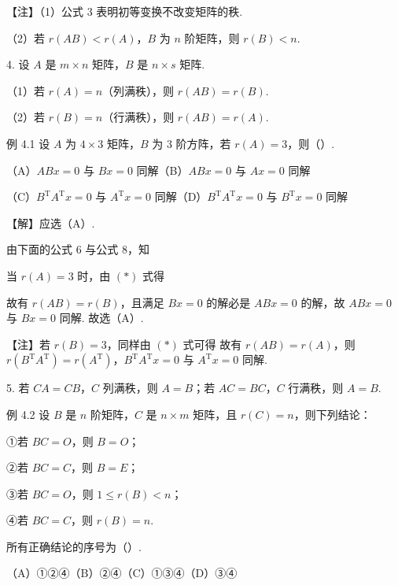 \begin{fnote}
【注】（1）公式 3 表明初等变换不改变矩阵的秩.

（2）若 $r(AB)<r(A)$，$B$ 为 $n$ 阶矩阵，则 $r(B)<n$.
\end{fnote}

4. 设 $A$ 是 $m\times n$ 矩阵，$B$ 是 $n\times s$ 矩阵.

（1）若 $r(A)=n$（列满秩），则 $r(AB)=r(B)$.

（2）若 $r(B)=n$（行满秩），则 $r(AB)=r(A)$.

\begin{fcard}{例 4.1}
设 $A$ 为 $4\times 3$ 矩阵，$B$ 为 3 阶方阵，若 $r(A)=3$，则（\quad）.

（A）$ABx=0$ 与 $Bx=0$ 同解\qquad\qquad（B）$ABx=0$ 与 $Ax=0$ 同解

（C）$B^{\mathrm T}A^{\mathrm T}x=0$ 与 $A^{\mathrm T}x=0$ 同解\qquad（D）$B^{\mathrm T}A^{\mathrm T}x=0$ 与 $B^{\mathrm T}x=0$ 同解
\end{fcard}

【解】应选（A）.

由下面的公式 6 与公式 8，知

当 $r(A)=3$ 时，由 $(*)$ 式得

故有 $r(AB)=r(B)$，且满足 $Bx=0$ 的解必是 $ABx=0$ 的解，故 $ABx=0$ 与 $Bx=0$ 同解. 故选（A）.


\begin{fnote}
【注】若 $r(B)=3$，同样由 $(*)$ 式可得
故有 $r(AB)=r(A)$，则 $r(B^{\mathrm T}A^{\mathrm T})=r(A^{\mathrm T})$，$B^{\mathrm T}A^{\mathrm T}x=0$ 与 $A^{\mathrm T}x=0$ 同解.
\end{fnote}

5. 若 $CA=CB$，$C$ 列满秩，则 $A=B$；若 $AC=BC$，$C$ 行满秩，则 $A=B$.

\begin{fcard}{例 4.2}
设 $B$ 是 $n$ 阶矩阵，$C$ 是 $n\times m$ 矩阵，且 $r(C)=n$，则下列结论：

①若 $BC=O$，则 $B=O$；

②若 $BC=C$，则 $B=E$；

③若 $BC=O$，则 $1\le r(B)<n$；

④若 $BC=C$，则 $r(B)=n$.

所有正确结论的序号为（\quad）.

（A）①②④\qquad（B）②④\qquad（C）①③④\qquad（D）③④
\end{fcard}

